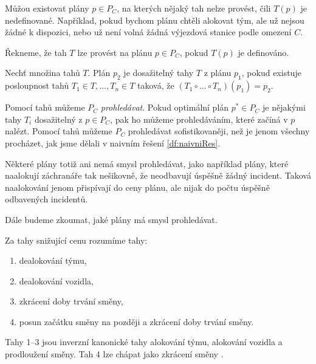 Můžou existovat plány $p \in P_C$, na kterých nějaký tah nelze provést, čili $T(p)$ je nedefinované.
Například, pokud bychom plánu chtěli alokovat tým, ale už nejsou žádné k dispozici, nebo už není volná žádná výjezdová stanice podle omezení $C$.

\begin{definice}
  Řekneme, že tah $T$ lze provést na plánu $p \in P_C$, pokud $T(p)$ je definováno.
\end{definice}

\begin{definice}
  Nechť množina tahů $T$.
  Plán $p_2$ je dosažitelný tahy $T$ z plánu $p_1$, pokud existuje posloupnost tahů $T_1 \in T, \dots, T_n \in T$ taková, že $(T_1 \circ \dots \circ T_n)(p_1) = p_2$.
\end{definice}

Pomocí tahů můžeme $P_C$ \textit{prohledávat}.
Pokud optimální plán $p^* \in P_C$ je nějakými tahy $T_i$ dosažitelný z $p \in P_C$, pak ho můžeme prohledáváním, které začíná v $p$ nalézt.
Pomocí tahů můžeme $P_C$ prohledávat sofistikovaněji, než je jenom všechny procházet, jak jsme dělali v naivním řešení \ref{df:naivniRes}.

Některé plány totiž ani nemá smysl prohledávat, jako například plány, které naalokují záchranáře tak nešikovně, že neodbavují úspěšně žádný incident.
Taková naalokování jenom přispívají do ceny plánu, ale nijak do počtu úspěšně odbavených incidentů.

Dále budeme zkoumat, jaké plány má smysl prohledávat.

\begin{definice}\label{df:invKanTahy}
  Za tahy snižující cenu rozumíme tahy:
  \begin{enumerate}
    \item
      dealokování týmu,

    \item
      dealokování vozidla,

    \item
      zkrácení doby trvání směny,

    \item
      posun začátku směny na později a zkrácení doby trvání směny.

  \end{enumerate}
\end{definice}

Tahy 1--3 jsou inverzní kanonické tahy alokování týmu, alokování vozidla a prodloužení směny.
Tah 4 lze chápat jako zkrácení směny .


